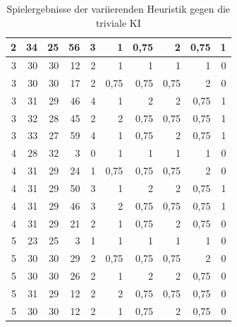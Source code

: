 \documentclass[12pt,a4paper,bibliography=totocnumbered,listof=totocnumbered]{article}
\begin{document}
\begin{table}[h]
\begin{tabular}{|rrrrrrrrrr|}
    2     & 34    & 25    & 56    & 3     & 1\cellcolor[rgb]{ .949,  .949,  .949}     & 0,75\cellcolor[rgb]{ .949,  .949,  .949}  & 2\cellcolor[rgb]{ .949,  .949,  .949}     & 0,75\cellcolor[rgb]{ .949,  .949,  .949}  & 1\cellcolor[rgb]{ .949,  .949,  .949} \\
    \hline
    3     & 30    & 30    & 12    & 2     & 1     & 1     & 1     & 1     & 0 \\
    3     & 30    & 30    & 17    & 2     & 0,75  & 0,75  & 0,75  & 2     & 0 \\
    3     & 31    & 29    & 46    & 4     & 1\cellcolor[rgb]{ .949,  .949,  .949}     & 2\cellcolor[rgb]{ .949,  .949,  .949}     & 2\cellcolor[rgb]{ .949,  .949,  .949}     & 0,75\cellcolor[rgb]{ .949,  .949,  .949}  & 1\cellcolor[rgb]{ .949,  .949,  .949} \\
    3     & 32    & 28    & 45    & 2     & 2\cellcolor[rgb]{ .949,  .949,  .949}     & 0,75\cellcolor[rgb]{ .949,  .949,  .949}  & 0,75\cellcolor[rgb]{ .949,  .949,  .949}  & 0,75\cellcolor[rgb]{ .949,  .949,  .949}  & 1\cellcolor[rgb]{ .949,  .949,  .949} \\
    3     & 33    & 27    & 59    & 4     & 1\cellcolor[rgb]{ .949,  .949,  .949}     & 0,75\cellcolor[rgb]{ .949,  .949,  .949}  & 2\cellcolor[rgb]{ .949,  .949,  .949}     & 0,75\cellcolor[rgb]{ .949,  .949,  .949}  & 1\cellcolor[rgb]{ .949,  .949,  .949} \\
    \hline
    4     & 28    & 32    & 3     & 0     & 1     & 1     & 1     & 1     & 0 \\
    4     & 31    & 29    & 24    & 1     & 0,75  & 0,75  & 0,75  & 2     & 0 \\
    4     & 31    & 29    & 50    & 3     & 1\cellcolor[rgb]{ .949,  .949,  .949}     & 2\cellcolor[rgb]{ .949,  .949,  .949}     & 2\cellcolor[rgb]{ .949,  .949,  .949}     & 0,75\cellcolor[rgb]{ .949,  .949,  .949}  & 1\cellcolor[rgb]{ .949,  .949,  .949} \\
    4     & 31    & 29    & 46    & 3     & 2\cellcolor[rgb]{ .949,  .949,  .949}     & 0,75\cellcolor[rgb]{ .949,  .949,  .949}  & 0,75\cellcolor[rgb]{ .949,  .949,  .949}  & 0,75\cellcolor[rgb]{ .949,  .949,  .949}  & 1\cellcolor[rgb]{ .949,  .949,  .949} \\
    4     & 31    & 29    & 21    & 2     & 1     & 0,75  & 2     & 0,75  & 0 \\
    \hline
    5     & 23    & 25    & 3     & 1     & 1     & 1     & 1     & 1     & 0 \\
    5     & 30    & 30    & 29    & 2     & 0,75  & 0,75  & 0,75  & 2     & 0 \\
    5     & 30    & 30    & 26    & 2     & 1     & 2     & 2     & 0,75  & 0 \\
    5     & 31    & 29    & 12    & 2     & 2     & 0,75  & 0,75  & 0,75  & 0 \\
    5     & 30    & 30    & 12    & 2     & 1     & 0,75  & 2     & 0,75  & 0 \\
    \hline
    \end{tabular}%
    \caption{Spielergebnisse der variierenden Heuristik gegen die triviale KI}
  \label{tab:heur-gew}%
\end{table}%
\end{document}
